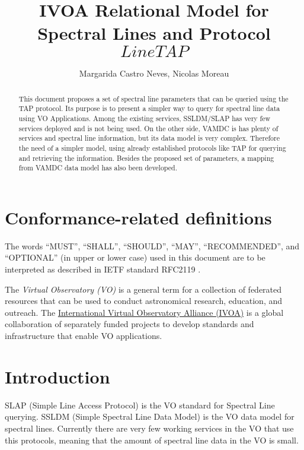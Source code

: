 \documentclass[11pt,a4paper]{ivoa}
\title{IVOA Relational Model for Spectral Lines and Protocol \(LineTAP\)}
\author{Margarida Castro Neves, Nicolas Moreau}
\begin{document}
\begin{abstract}

This document proposes a set of  spectral line parameters that can be queried using the TAP protocol. Its purpose is to present a simpler way to query for spectral line data using VO Applications. Among the existing services, SSLDM/SLAP has very few services deployed and is not being used. On the other side, VAMDC is has plenty of services and spectral line information, but its data model is very complex. Therefore the need of a simpler model, using already established protocols like TAP for querying and retrieving the information. Besides the proposed set of parameters, a mapping from VAMDC data model has also been developed.

\end{abstract}




\section*{Conformance-related definitions}

The words ``MUST'', ``SHALL'', ``SHOULD'', ``MAY'', ``RECOMMENDED'', and
``OPTIONAL'' (in upper or lower case) used in this document are to be
interpreted as described in IETF standard RFC2119 \citep{std:RFC2119}.

The \emph{Virtual Observatory (VO)} is a
general term for a collection of federated resources that can be used
to conduct astronomical research, education, and outreach.
The \href{http://www.ivoa.net}{International
Virtual Observatory Alliance (IVOA)} is a global
collaboration of separately funded projects to develop standards and
infrastructure that enable VO applications.


\section{Introduction}

SLAP (Simple Line Access Protocol)\citep{2010ivoa.specQ1209O} is the VO standard for Spectral Line querying. SSLDM (Simple Spectral Line Data Model)\citep{2010ivoa.spec.1209O} is the VO data model for spectral lines.
Currently there are very few working services in the VO that use this protocols, meaning that the amount of spectral line data in the VO is small. 
\end{document}
